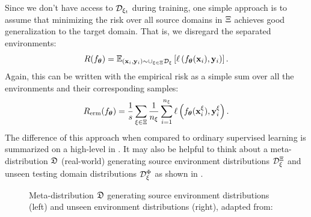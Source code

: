 Since we don't have access to $\mathcal{D}_{\xi_{t}}$ during training, one simple approach is to assume that minimizing the risk over all source domains in $\Xi$ achieves good generalization to the target domain. That is, we disregard the separated environments:
\begin{equation}
\label{eq:erm}
    R(f_{\boldsymbol{\theta}}) = \mathbb{E}_{(\mathbf{x}_i, \mathbf{y}_i) \sim \cup_{\xi \in \Xi} \mathcal{D}_\xi} \left[\ell\left(f_{\boldsymbol{\theta}}(\mathbf{x}_i), \mathbf{y}_i\right) \right].
\end{equation}
Again, this can be written with the empirical risk as a simple sum over all the environments and their corresponding samples:
\begin{equation}
\label{eq:domain_risk_emp}
    R_{\mathrm{erm}}(f_{\boldsymbol{\theta}}) = \frac{1}{s} \sum_{\xi \in \Xi} \frac{1}{n_\xi} \sum_{i=1}^{n_\xi} \ell\left(f_{\boldsymbol{\theta}}(\mathbf{x}_i^{\xi}), \mathbf{y}_i^{\xi}\right).
\end{equation}
The difference of this approach when compared to ordinary supervised learning is summarized on a high-level in . It may also be helpful to think about a meta-distribution $\meta$ (real-world) generating source environment distributions $\mathcal{D}_\xi^\Xi$ and unseen testing domain distributions $\mathcal{D}_\xi^\Phi$ as shown in .
\begin{figure}[htbp]
    \centering
    \caption[Meta-distribution $\meta$ generating source and unseen domain distributions]{Meta-distribution $\meta$ generating source environment distributions (left) and unseen environment distributions (right), adapted from: \citep{albuquerque2019generalizing}}
    \label{fig:meta_domain}
\end{figure}

